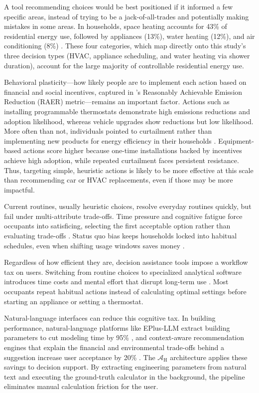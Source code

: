 \documentclass[a4paper,fleqn]{cas-dc}
\begin{document}
A tool recommending choices would be best positioned if it informed a few specific areas, instead of trying to be a jack-of-all-trades and potentially making mistakes in some areas. In households, space heating accounts for 43\% of residential energy use, followed by appliances (13\%), water heating (12\%), and air conditioning (8\%) \citep{eia_recs2020}. These four categories, which map directly onto this study's three decision types (HVAC, appliance scheduling, and water heating via shower duration), account for the large majority of controllable residential energy use.

Behavioral plasticity---how likely people are to implement each action based on financial and social incentives, captured in \citet{dietz2009}'s Reasonably Achievable Emission Reduction (RAER) metric---remains an important factor. Actions such as installing programmable thermostats demonstrate high emissions reductions and adoption likelihood, whereas vehicle upgrades show reductions but low likelihood. More often than not, individuals pointed to curtailment rather than implementing new products for energy efficiency in their households \citep{attari2010}. Equipment-based actions score higher because one-time installations backed by incentives achieve high adoption, while repeated curtailment faces persistent resistance. Thus, targeting simple, heuristic actions is likely to be more effective at this scale than recommending car or HVAC replacements, even if those may be more impactful.

Current routines, usually heuristic choices, resolve everyday routines quickly, but fail under multi-attribute trade-offs. Time pressure and cognitive fatigue force occupants into satisficing, selecting the first acceptable option rather than evaluating trade-offs \citep{bobadilla2018,hahn1992}. Status quo bias keeps households locked into habitual schedules, even when shifting usage windows saves money \citep{gill2022}.

Regardless of how efficient they are, decision assistance tools impose a workflow tax on users. Switching from routine choices to specialized analytical software introduces time costs and mental effort that disrupt long-term use \citep{ariely2001,leclerc1995}. Most occupants repeat habitual actions instead of calculating optimal settings before starting an appliance or setting a thermostat. 

Natural-language interfaces can reduce this cognitive tax. In building performance, natural-language platforms like EPlus-LLM extract building parameters to cut modeling time by 95\% \citep{jiang2024eplus}, and context-aware recommendation engines that explain the financial and environmental trade-offs behind a suggestion increase user acceptance by 20\% \citep{zharova2024}. The $\mathcal{A}_{\text{H}}$ architecture applies these savings to decision support. By extracting engineering parameters from natural text and executing the ground-truth calculator in the background, the pipeline eliminates manual calculation friction for the user.
\end{document}
